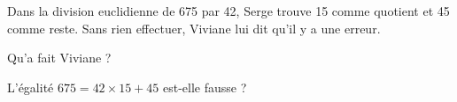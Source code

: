 Dans la division euclidienne de 675 par 42, Serge trouve 15 comme quotient et 45 comme reste. Sans rien effectuer, Viviane lui dit qu'il y a une erreur.
\begin{myenumerate}
  \item Qu'a fait Viviane ?
  \item L'égalité $675 = 42\times 15 + 45$ est-elle fausse ?
\end{myenumerate}
